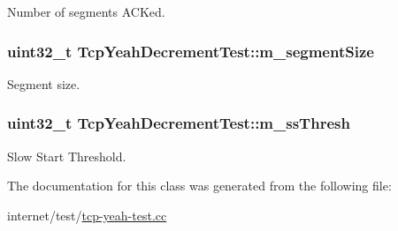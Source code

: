 Number of segments A\+C\+Ked. 

\subsubsection[{\texorpdfstring{m\+\_\+segment\+Size}{m_segmentSize}}]{\setlength{\rightskip}{0pt plus 5cm}uint32\+\_\+t Tcp\+Yeah\+Decrement\+Test\+::m\+\_\+segment\+Size\hspace{0.3cm}{\ttfamily [private]}}\hypertarget{classTcpYeahDecrementTest_a9d6ce4cfe2bb3251f248baa0f44c8cb2}{}\label{classTcpYeahDecrementTest_a9d6ce4cfe2bb3251f248baa0f44c8cb2}


Segment size. 

\subsubsection[{\texorpdfstring{m\+\_\+ss\+Thresh}{m_ssThresh}}]{\setlength{\rightskip}{0pt plus 5cm}uint32\+\_\+t Tcp\+Yeah\+Decrement\+Test\+::m\+\_\+ss\+Thresh\hspace{0.3cm}{\ttfamily [private]}}\hypertarget{classTcpYeahDecrementTest_a81f39446eefe8ed13781afe771ec6a84}{}\label{classTcpYeahDecrementTest_a81f39446eefe8ed13781afe771ec6a84}


Slow Start Threshold. 



The documentation for this class was generated from the following file\+:\begin{DoxyCompactItemize}
\item 
internet/test/\hyperlink{tcp-yeah-test_8cc}{tcp-\/yeah-\/test.\+cc}\end{DoxyCompactItemize}
